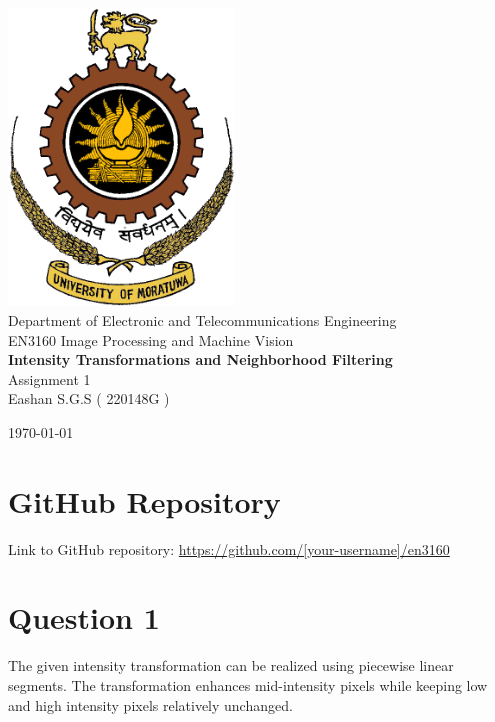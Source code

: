 \documentclass[10pt,a4paper]{article}
\begin{document}
\begin{titlepage}
    \centering
    \vspace*{2cm}

    \includegraphics[width=6cm]{image.png}\\[1cm]
    {\LARGE Department of Electronic and Telecommunications Engineering}\\[0.5cm]
    
    {\Large EN3160 Image Processing and Machine Vision}\\[1cm]
    
    {\huge \textbf{Intensity Transformations and Neighborhood Filtering}}\\[0.5cm]
    {\Large Assignment 1}\\[2cm]
    
    {\Large Eashan S.G.S ( 220148G )}\\[1cm]
    
    \vfill
    
    {\large \today}
\end{titlepage}

\section*{GitHub Repository}
Link to GitHub repository: \url{https://github.com/[your-username]/en3160}

\section{Question 1}
The given intensity transformation can be realized using piecewise linear segments. The transformation enhances mid-intensity pixels while keeping low and high intensity pixels relatively unchanged.
\end{document}
